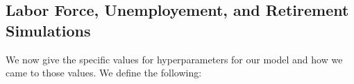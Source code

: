 \documentclass[11pt]{amsart}
\begin{document}
\subsection{Labor Force, Unemployement, and Retirement Simulations}

We now give the specific values for hyperparameters for our model and how we came to those values. We define the following:

\end{document}
